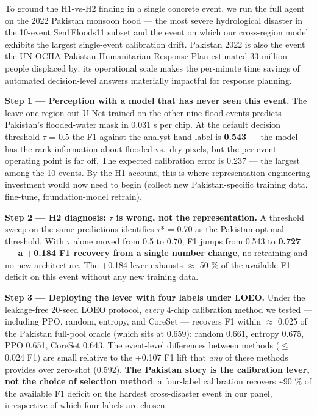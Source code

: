 To ground the H1-vs-H2 finding in a single concrete event, we run the
full agent on the 2022 Pakistan monsoon flood --- the most severe
hydrological disaster in the 10-event Sen1Floods11 subset and the event
on which our cross-region model exhibits the largest single-event
calibration drift. Pakistan 2022 is also the event the UN OCHA Pakistan
Humanitarian Response Plan estimated 33 million people displaced by;
its operational scale makes the per-minute time savings of automated
decision-level answers materially impactful for response planning.

\textbf{Step 1 --- Perception with a model that has never seen this event.}
The leave-one-region-out U-Net trained on the other nine flood events
predicts Pakistan's flooded-water mask in 0.031 s per chip. At the
default decision threshold $\tau$ = 0.5 the F1 against the analyst hand-label
is \textbf{0.543} --- the model has the rank information about flooded vs.~dry
pixels, but the per-event operating point is far off. The expected
calibration error is 0.237 --- the largest among the 10 events. By the H1
account, this is where representation-engineering investment would now
need to begin (collect new Pakistan-specific training data, fine-tune,
foundation-model retrain).

\textbf{Step 2 --- H2 diagnosis: $\tau$ is wrong, not the representation.} A
threshold sweep on the same predictions identifies $\tau$* = 0.70 as the
Pakistan-optimal threshold. With $\tau$ alone moved from 0.5 to 0.70, F1
jumps from 0.543 to \textbf{0.727 --- a +0.184 F1 recovery from a single number
change}, no retraining and no new architecture. The +0.184 lever
exhausts $\approx$ 50 \% of the available F1 deficit on this event without any
new training data.

\textbf{Step 3 --- Deploying the lever with four labels under LOEO.} Under the
leakage-free 20-seed LOEO protocol, \emph{every} 4-chip calibration method
we tested --- including PPO, random, entropy, and CoreSet --- recovers F1
within $\approx$ 0.025 of the Pakistan full-pool oracle (which sits at 0.659):
random 0.661, entropy 0.675, PPO 0.651, CoreSet 0.643. The
event-level differences between methods ($\leq$ 0.024 F1) are small relative
to the +0.107 F1 lift that \emph{any} of these methods provides over
zero-shot (0.592). \textbf{The Pakistan story is the calibration lever, not
the choice of selection method}: a four-label calibration recovers
\textasciitilde90 \% of the available F1 deficit on the hardest cross-disaster event
in our panel, irrespective of which four labels are chosen.


